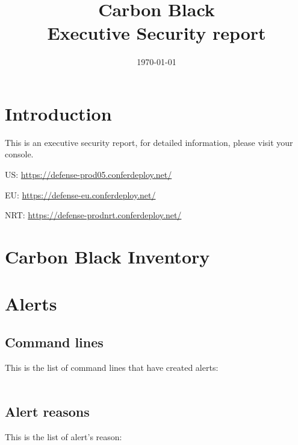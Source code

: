 \documentclass[12pt,letterpaper]{report}
\begin{document}

\thispagestyle{empty}
\bannercbcontainer
\title{Carbon Black\\Executive Security report}

\date{\today}
\logocbcontainer

\newpage

\tableofcontents
\listoftables
\listoffigures

\chapter{Introduction}

This is an executive security report, for detailed information, please visit your console.
\vspace{1cm}

US: \href{https://defense-prod05.conferdeploy.net/}{https://defense-prod05.conferdeploy.net/}

EU: \href{https://defense-eu.conferdeploy.net/}{https://defense-eu.conferdeploy.net/}

NRT: \href{https://defense-prodnrt.conferdeploy.net/}{https://defense-prodnrt.conferdeploy.net/}


\chapter{Carbon Black Inventory}


\chapter{Alerts}
\section{Command lines}
This is the list of command lines that have created alerts:\\
\\


\section{Alert reasons}
This is the list of alert's reason:\\
\\
\end{document}
